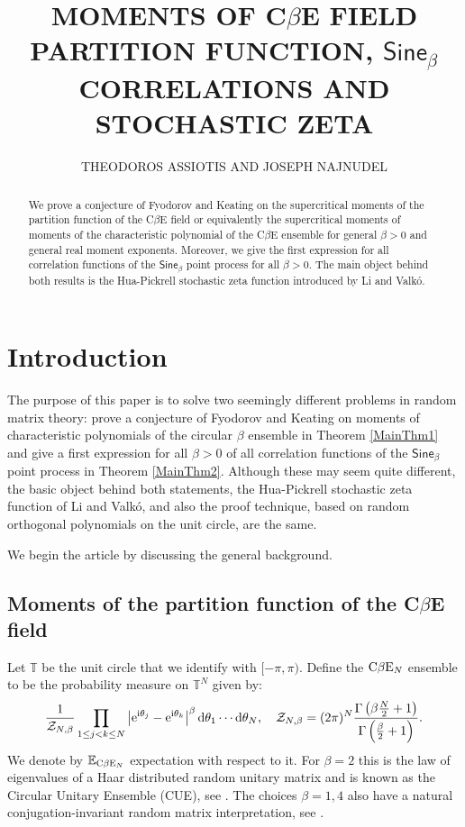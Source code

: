 \documentclass[]{article}
\title{\large \bf MOMENTS OF C$\beta$E FIELD PARTITION FUNCTION, $\mathsf{Sine}_{\beta}$ CORRELATIONS AND STOCHASTIC ZETA}
\author{\small THEODOROS ASSIOTIS AND JOSEPH NAJNUDEL}
\date{}
\begin{document}
\maketitle

\begin{abstract} 
We prove a conjecture of Fyodorov and Keating on  the supercritical moments of the partition function of the C$\beta$E field or equivalently the supercritical moments of moments of the characteristic polynomial of the C$\beta$E ensemble for general $\beta>0$ and general real moment exponents. Moreover, we give the first expression for all correlation functions of the $\mathsf{Sine}_\beta$ point process for all $\beta>0$. The main object behind both results is the Hua-Pickrell stochastic zeta function introduced by Li and Valk\'{o}.
\end{abstract}

\tableofcontents


\section{Introduction}

The purpose of this paper is to solve two seemingly different problems in random matrix theory: prove a conjecture of Fyodorov and Keating on moments of characteristic polynomials of the circular $\beta$ ensemble in Theorem \ref{MainThm1} and give a first expression for all $\beta>0$ of all correlation functions of the $\mathsf{Sine}_\beta$ point process in Theorem \ref{MainThm2}. Although these may seem quite different, the basic object behind both statements, the Hua-Pickrell stochastic zeta function of Li and Valk\'{o}, and also the proof technique, based on random orthogonal polynomials on the unit circle, are the same.

We begin the article by discussing the general background. 


\subsection{Moments of the partition function of the C$\beta$E field}

Let $\mathbb{T}$ be the unit circle that we identify with $[-\pi,\pi)$. Define the $\textnormal{C}\beta \textnormal{E}_N$ ensemble to be the probability measure on $\mathbb{T}^N$ given by:
\begin{equation*}
\frac{1}{\mathcal{Z}_{N,\beta}}\prod_{1\le j <k \le N} \left|\mathrm{e}^{\textnormal{i}\theta_j}-\mathrm{e}^{\textnormal{i}\theta_k}\right|^\beta \mathrm{d}\theta_1\cdots \mathrm{d}\theta_N, \ \  \ \mathcal{Z}_{N,\beta}=(2\pi)^N \frac{\Gamma\left(\beta\frac{N}{2}+1\right)}{\Gamma\left(\frac{\beta}{2}+1\right)}.
\end{equation*}
We denote by $\mathbb{E}_{\textnormal{C}\beta \textnormal{E}_N}$ expectation with respect to it. For $\beta=2$ this is the law of eigenvalues of a Haar distributed random unitary matrix and is known as the Circular Unitary Ensemble (CUE), see \cite{ForresterBook}. The choices $\beta=1, 4$ also have a natural conjugation-invariant random matrix interpretation, see \cite{ForresterBook}.
\end{document}

